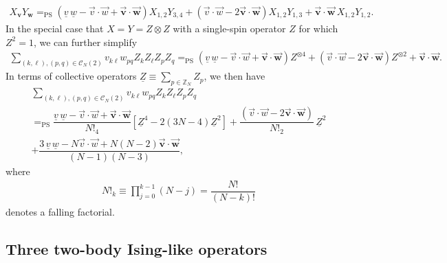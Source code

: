 \documentclass[nofootinbib,notitlepage,11pt]{revtex4-2}
\newcommand{\f}[2]{\dfrac{#1}{#2}} %
\newcommand{\p}[1]{\left(#1\right)} %
\renewcommand{\sp}[1]{\left[#1\right]} %
\renewcommand{\c}{\cdot} %
\newcommand{\m}{\bm} %
\renewcommand{\v}{\vec} %
\newcommand{\1}{\mathds{1}}
\newcommand{\C}{\mathcal{C}}
\newcommand{\ZZ}{\mathbb{Z}}
\newcommand{\EQPS}{=_{\text{PS}}}
\newcommand{\col}{\underline}
\begin{document}
\begin{align}
  X_{\m v} Y_{\m w}
  \EQPS \p{\col{v}\,\col{w} -\v v\c\v w + \v{\m v}\c\v{\m w}}
  X_{1,2} Y_{3,4}
  + \p{\v v\c\v w - 2 \v{\m v} \c \v{\m w}} X_{1,2} Y_{1,3}
  + \v{\m v} \c \v{\m w}\, X_{1,2} Y_{1,2}.
\end{align}
In the special case that $X=Y=Z\otimes Z$ with a single-spin operator
$Z$ for which $Z^2=1$, we can further simplify
\begin{align}
  \sum_{\p{k,\ell},\p{p,q}\in\C_N\p{2}} v_{k\ell} w_{pq}
  Z_k Z_\ell Z_p Z_q
  \EQPS \p{\col{v}\,\col{w} -\v v\c\v w + \v{\m v}\c\v{\m w}}
  Z^{\otimes 4}
  + \p{\v v\c\v w - 2 \v{\m v} \c \v{\m w}} Z^{\otimes 2}
  + \v{\m v}\c\v{\m w}.
\end{align}
In terms of collective operators
$\col{Z} \equiv \sum_{p\in\ZZ_N} Z_p$, we then have
\begin{multline}
  \sum_{\p{k,\ell},\p{p,q}\in\C_N\p{2}} v_{k\ell} w_{pq}
  Z_k Z_\ell Z_p Z_q \\
  \EQPS \f{\col{v}\,\col{w} -\v v\c\v w + \v{\m v}\c\v{\m w}}{N!_4}
  \sp{\col{Z}^4 - 2\p{3N-4} \col{Z}^2}
  + \f{\p{\v v\c\v w - 2 \v{\m v} \c \v{\m w}}}{N!_2}\, \col{Z}^2 \\
  + \f{3\,\col{v}\,\col{w} - N \v v\c\v w + N\p{N-2}\v{\m v}\c\v{\m
      w}}{\p{N-1}\p{N-3}},
\end{multline}
where
\begin{align}
  N!_k \equiv \prod_{j=0}^{k-1} \p{N-j} = \f{N!}{\p{N-k}!}
\end{align}
denotes a falling factorial.

\subsection{Three two-body Ising-like operators}
\end{document}
